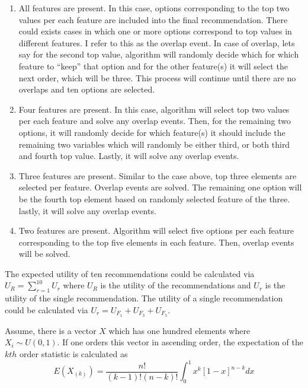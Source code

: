 \documentclass[a4paper,12pt]{article}
\begin{document}
\begin{enumerate}
    \item  All features are present. In this case, options corresponding to the top two values per each feature are included into the final recommendation. There could exists cases in which one or more options correspond to top values in different features. I refer to this as the overlap event. In case of overlap, lets say for the second top value, algorithm will randomly decide which for which feature to ``keep'' that option and for the other feature(s) it will select the next order, which will be three. This process will continue until there are no overlaps and ten options are selected.
    \item  Four features are present. In this case, algorithm will select top two values per each feature and solve any overlap events. Then, for the remaining two options, it will randomly decide for which feature(s) it should include the remaining two variables which will randomly be either third, or both third and fourth top value. Lastly, it will solve any overlap events.
    \item  Three features are present. Similar to the case above, top three elements are selected per feature. Overlap events are solved. The remaining one option will be the fourth top element based on randomly selected feature of the three. lastly, it will solve any overlap events.
    \item  Two features are present. Algorithm will select five options per each feature corresponding to the top five elements in each feature. Then, overlap events will be solved.
\end{enumerate}


The expected utility of ten recommendations could be calculated via $U_R = \sum_{r = 1}^{10}{U_r}$ where $U_R$ is the utility of the recommendations and $U_r$ is the utility of the single recommendation. The utility of a single recommendation could be calculated via $U_r = U_{F_1} + U_{F_3} + U_{F_5}$.

Assume, there is a vector $X$ which has one hundred elements  where $X_i\sim U\left(0,1\right)$. If one orders this vector in ascending order, the expectation of the $kth$ order statistic is calculated as
$$
E\left(X_{\left(k\right)}\right)=\frac{n!}{\left(k-1\right)!\left(n-k\right)!}\int_{0}^{1}{x^k\left[1-x\right]^{n-k}dx}
$$
\end{document}
